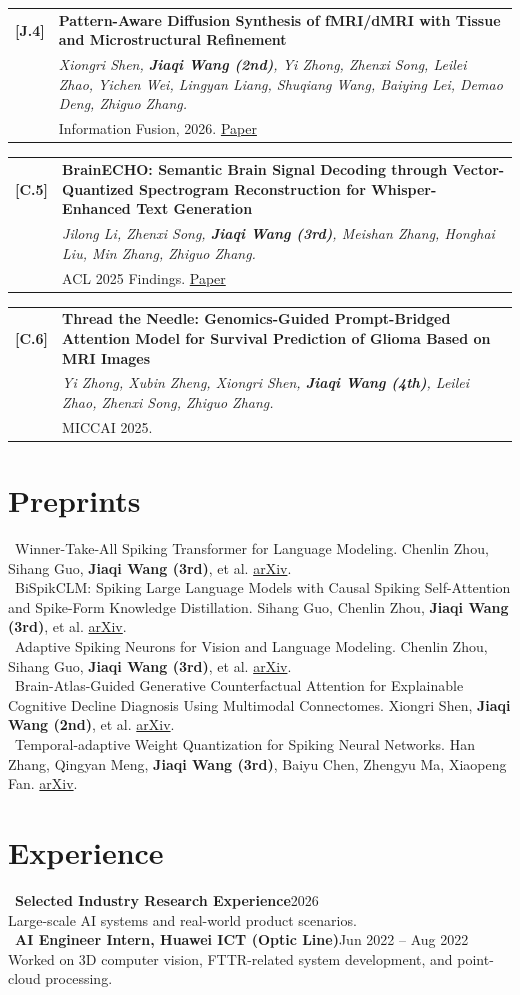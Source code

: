 \documentclass[10pt,a4paper]{article}
\makeatletter
\newcommand{\pub}[4]{
  \begin{tabularx}{\textwidth}{@{}p{0.64in}X@{}}
    \textbf{[#1]} & \textbf{#2} \\
                 & \textit{#3} \\
                 & #4
  \end{tabularx}\vspace{2pt}
}
\makeatother
\begin{document}
\pub{J.4}{Pattern-Aware Diffusion Synthesis of fMRI/dMRI with Tissue and Microstructural Refinement}{Xiongri Shen, \textbf{Jiaqi Wang (2nd)}, Yi Zhong, Zhenxi Song, Leilei Zhao, Yichen Wei, Lingyan Liang, Shuqiang Wang, Baiying Lei, Demao Deng, Zhiguo Zhang.}{Information Fusion, 2026. \href{https://arxiv.org/abs/2511.04963}{Paper}}
\pub{C.5}{BrainECHO: Semantic Brain Signal Decoding through Vector-Quantized Spectrogram Reconstruction for Whisper-Enhanced Text Generation}{Jilong Li, Zhenxi Song, \textbf{Jiaqi Wang (3rd)}, Meishan Zhang, Honghai Liu, Min Zhang, Zhiguo Zhang.}{ACL 2025 Findings. \href{https://arxiv.org/abs/2410.14971}{Paper}}
\pub{C.6}{Thread the Needle: Genomics-Guided Prompt-Bridged Attention Model for Survival Prediction of Glioma Based on MRI Images}{Yi Zhong, Xubin Zheng, Xiongri Shen, \textbf{Jiaqi Wang (4th)}, Leilei Zhao, Zhenxi Song, Zhiguo Zhang.}{MICCAI 2025.}

\section*{Preprints}
\textbullet\ Winner-Take-All Spiking Transformer for Language Modeling. Chenlin Zhou, Sihang Guo, \textbf{Jiaqi Wang (3rd)}, et al. \href{https://arxiv.org/abs/2604.11321}{arXiv}.\\
\textbullet\ BiSpikCLM: Spiking Large Language Models with Causal Spiking Self-Attention and Spike-Form Knowledge Distillation. Sihang Guo, Chenlin Zhou, \textbf{Jiaqi Wang (3rd)}, et al. \href{https://arxiv.org/abs/2605.13859}{arXiv}.\\
\textbullet\ Adaptive Spiking Neurons for Vision and Language Modeling. Chenlin Zhou, Sihang Guo, \textbf{Jiaqi Wang (3rd)}, et al. \href{https://arxiv.org/abs/2604.12365}{arXiv}.\\
\textbullet\ Brain-Atlas-Guided Generative Counterfactual Attention for Explainable Cognitive Decline Diagnosis Using Multimodal Connectomes. Xiongri Shen, \textbf{Jiaqi Wang (2nd)}, et al. \href{https://arxiv.org/abs/2606.01237}{arXiv}.\\
\textbullet\ Temporal-adaptive Weight Quantization for Spiking Neural Networks. Han Zhang, Qingyan Meng, \textbf{Jiaqi Wang (3rd)}, Baiyu Chen, Zhengyu Ma, Xiaopeng Fan. \href{https://arxiv.org/abs/2511.17567}{arXiv}.

\section*{Experience}
\textbullet\ \textbf{Selected Industry Research Experience}\hfill 2026\\
Large-scale AI systems and real-world product scenarios.\\
\textbullet\ \textbf{AI Engineer Intern, Huawei ICT (Optic Line)}\hfill Jun 2022 -- Aug 2022\\
Worked on 3D computer vision, FTTR-related system development, and point-cloud processing.
\end{document}
